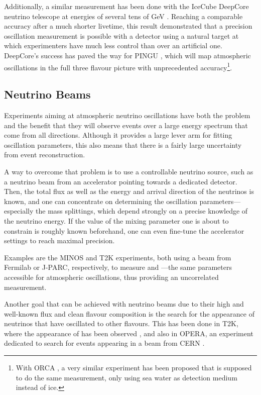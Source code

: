Additionally, a similar measurement has been done with the IceCube DeepCore
neutrino telescope at energies of several tens of GeV \cite{DCosc}. Reaching a
comparable accuracy after a much shorter livetime, this result demonstrated that
a precision oscillation measurement is possible with a detector using a natural
target at which experimenters have much less control than over an artificial 
one.
DeepCore's success has paved the way for PINGU \cite{LoI}, which will map
atmospheric oscillations in the full three flavour picture with unprecedented
accuracy\footnote{With ORCA \cite{ORCA}, a very similar experiment has been
proposed that is supposed to do the same measurement, only using sea water
as detection medium instead of ice.}.

\subsection{Neutrino Beams}

Experiments aiming at atmospheric neutrino oscillations have both the problem
and the benefit that they will observe events over a large energy spectrum that
come from all directions. Although it provides a large lever arm for fitting
oscillation parameters, this also means that there is a fairly large uncertainty
from event reconstruction.

A way to overcome that problem is to use a controllable neutrino source, such as
a neutrino beam from an accelerator pointing towards a dedicated detector. Then,
the total flux as well as the energy and arrival direction of the neutrinos is
known, and one can concentrate on determining the oscillation
parameters---especially the mass splittings, which depend strongly on a precise
knowledge of the neutrino energy. If the value of the mixing parameter one is
about to constrain is roughly known beforehand, one can even fine-tune the
accelerator settings to reach maximal precision.

Examples are the MINOS \cite{MINOSparams} and T2K \cite{T2Kparams} experiments,
both using a \numu beam from Fermilab or J-PARC, respectively, to measure
 and ---the same parameters accessible for atmospheric
oscillations, thus providing an uncorrelated measurement.

Another goal that can be achieved with neutrino beams due to their high and
well-known flux and clean flavour composition is the search for the appearance
of neutrinos that have oscillated to other flavours. This has been done in T2K,
where the appearance of \nue has been observed \cite{T2Kapp}, and also in
OPERA, an experiment dedicated to search for \nutau events appearing in a \numu
beam from CERN \cite{OPERAapp}.

